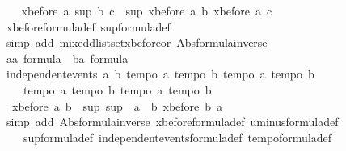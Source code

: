 \begin{isabellebody}
\ \ \isamarkupfalse%
\ {\isachardoublequoteopen}xbefore\ a\ {\isacharparenleft}sup\ b\ c{\isacharparenright}\ {\isacharequal}\ sup\ {\isacharparenleft}xbefore\ a\ b{\isacharparenright}\ {\isacharparenleft}xbefore\ a\ c{\isacharparenright}{\isachardoublequoteclose}\isanewline
\ \ \isamarkupfalse%
\ xbefore{\isacharunderscore}formula{\isacharunderscore}def\ sup{\isacharunderscore}formula{\isacharunderscore}def\isanewline
\ \ \isamarkupfalse%
\ {\isacharparenleft}simp\ add{\isacharcolon}\ mixed{\isacharunderscore}dlistset{\isacharunderscore}xbefore{\isacharunderscore}or{}\ Abs{\isacharunderscore}formula{\isacharunderscore}inverse{\isacharparenright}\isanewline
\ \ \isamarkupfalse%
\ \isanewline
\ \ \isamarkupfalse%
\ a{\isacharcolon}{\isacharcolon}{\isachardoublequoteopen}{\isacharprime}a\ formula{\isachardoublequoteclose}\ \ b{\isacharcolon}{\isacharcolon}{\isachardoublequoteopen}{\isacharprime}a\ formula{\isachardoublequoteclose}\isanewline
\ \ \isamarkupfalse%
\ {\isachardoublequoteopen}independent{\isacharunderscore}events\ a\ b{\isachardoublequoteclose}\ {\isachardoublequoteopen}tempo{}\ a{\isachardoublequoteclose}\ {\isachardoublequoteopen}tempo{}\ b{\isachardoublequoteclose}\ {\isachardoublequoteopen}tempo{}\ a{\isachardoublequoteclose}\ {\isachardoublequoteopen}tempo{}\ b{\isachardoublequoteclose}\isanewline
\ \ \ \ {\isachardoublequoteopen}tempo{}\ a{\isachardoublequoteclose}\ {\isachardoublequoteopen}tempo{}\ b{\isachardoublequoteclose}\ {\isachardoublequoteopen}tempo{}\ a{\isachardoublequoteclose}\ {\isachardoublequoteopen}tempo{}\ b{\isachardoublequoteclose}\isanewline
\ \ \isamarkupfalse%
\ {\isachardoublequoteopen}{\isacharparenleft}{\isacharminus}\ xbefore\ a\ b{\isacharparenright}\ {\isacharequal}\ {\isacharparenleft}sup\ {\isacharparenleft}sup\ {\isacharparenleft}{\isacharminus}\ a{\isacharparenright}\ {\isacharparenleft}{\isacharminus}\ b{\isacharparenright}{\isacharparenright}\ {\isacharparenleft}xbefore\ b\ a{\isacharparenright}{\isacharparenright}{\isachardoublequoteclose}\isanewline
\ \ \isamarkupfalse%
\ {\isacharparenleft}simp\ add{\isacharcolon}\ Abs{\isacharunderscore}formula{\isacharunderscore}inverse\ xbefore{\isacharunderscore}formula{\isacharunderscore}def\ uminus{\isacharunderscore}formula{\isacharunderscore}def\ \isanewline
\ \ \ \ sup{\isacharunderscore}formula{\isacharunderscore}def\ independent{\isacharunderscore}events{\isacharunderscore}formula{\isacharunderscore}def\ tempo{}{\isacharunderscore}formula{\isacharunderscore}def\ \isanewline

\end{isabellebody}
